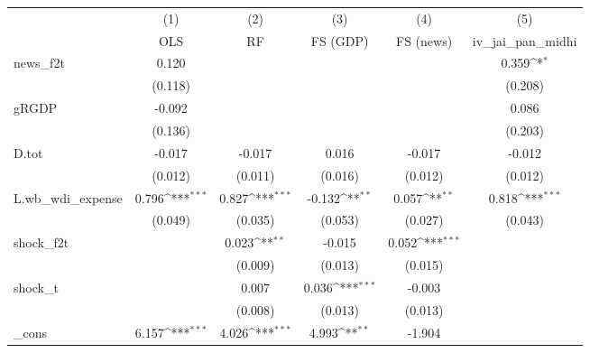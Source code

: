 {
\def\sym#1{\ifmmode^{#1}\else\(^{#1}\)\fi}
\begin{tabular}{l*{5}{c}}
\toprule
            &\multicolumn{1}{c}{(1)}&\multicolumn{1}{c}{(2)}&\multicolumn{1}{c}{(3)}&\multicolumn{1}{c}{(4)}&\multicolumn{1}{c}{(5)}\\
            &\multicolumn{1}{c}{OLS}&\multicolumn{1}{c}{RF}&\multicolumn{1}{c}{FS (GDP)}&\multicolumn{1}{c}{FS (news)}&\multicolumn{1}{c}{iv\_jai\_pan\_midhi}\\
\midrule
news\_f2t    &       0.120         &                     &                     &                     &       0.359\sym{*}  \\
            &     (0.118)         &                     &                     &                     &     (0.208)         \\
\addlinespace
gRGDP       &      -0.092         &                     &                     &                     &       0.086         \\
            &     (0.136)         &                     &                     &                     &     (0.203)         \\
\addlinespace
D.tot       &      -0.017         &      -0.017         &       0.016         &      -0.017         &      -0.012         \\
            &     (0.012)         &     (0.011)         &     (0.016)         &     (0.012)         &     (0.012)         \\
\addlinespace
L.wb\_wdi\_expense&       0.796\sym{***}&       0.827\sym{***}&      -0.132\sym{**} &       0.057\sym{**} &       0.818\sym{***}\\
            &     (0.049)         &     (0.035)         &     (0.053)         &     (0.027)         &     (0.043)         \\
\addlinespace
shock\_f2t   &                     &       0.023\sym{**} &      -0.015         &       0.052\sym{***}&                     \\
            &                     &     (0.009)         &     (0.013)         &     (0.015)         &                     \\
\addlinespace
shock\_t     &                     &       0.007         &       0.036\sym{***}&      -0.003         &                     \\
            &                     &     (0.008)         &     (0.013)         &     (0.013)         &                     \\
\addlinespace
\_cons      &       6.157\sym{***}&       4.026\sym{***}&       4.993\sym{**} &      -1.904         &                     \\

\end{tabular}}
